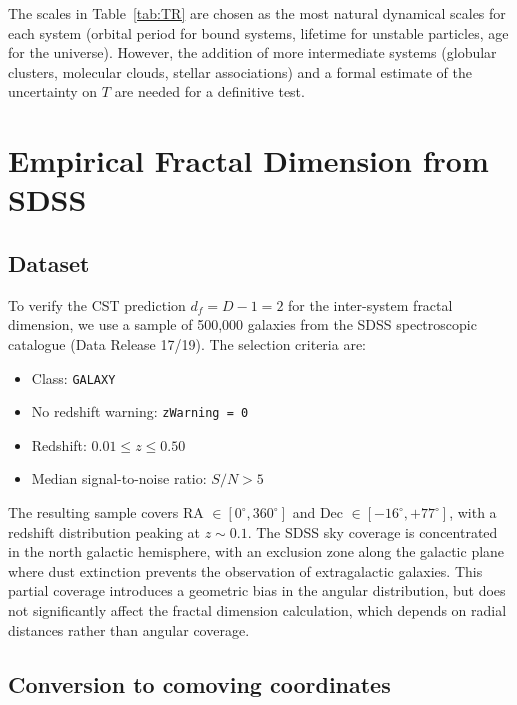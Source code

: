 \documentclass[10pt,a4paper]{article}
\begin{document}
The scales in Table~\ref{tab:TR} are chosen as the most natural dynamical scales for each system (orbital period for bound systems, lifetime for unstable particles, age for the universe). However, the addition of more intermediate systems (globular clusters, molecular clouds, stellar associations) and a formal estimate of the uncertainty on $T$ are needed for a definitive test.


\section{Empirical Fractal Dimension from SDSS}\label{sec:sdss}

\subsection{Dataset}

To verify the CST prediction $d_f = D - 1 = 2$ for the inter-system fractal dimension, we use a sample of 500,000 galaxies from the SDSS spectroscopic catalogue \cite{York2000} (Data Release 17/19). The selection criteria are:
\begin{itemize}
\item Class: \texttt{GALAXY}
\item No redshift warning: \texttt{zWarning = 0}
\item Redshift: $0.01 \leq z \leq 0.50$
\item Median signal-to-noise ratio: $S/N > 5$
\end{itemize}

The resulting sample covers RA $\in [0^\circ, 360^\circ]$ and Dec $\in [-16^\circ, +77^\circ]$, with a redshift distribution peaking at $z \sim 0.1$. The SDSS sky coverage is concentrated in the north galactic hemisphere, with an exclusion zone along the galactic plane where dust extinction prevents the observation of extragalactic galaxies. This partial coverage introduces a geometric bias in the angular distribution, but does not significantly affect the fractal dimension calculation, which depends on radial distances rather than angular coverage.

\subsection{Conversion to comoving coordinates}
\end{document}
